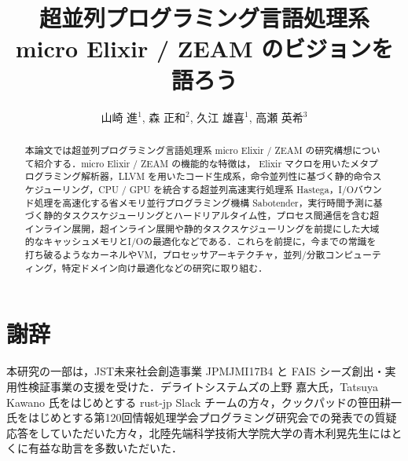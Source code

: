 \documentclass[japanese]{jssst_ppl}
\title{超並列プログラミング言語処理系 micro Elixir / ZEAM のビジョンを語ろう}
\author{山崎 進$^1$, 森 正和$^2$, 久江 雄喜$^1$, 高瀬 英希$^3$}
\begin{document}
\maketitle

\begin{abstract}
本論文では超並列プログラミング言語処理系 micro Elixir / ZEAM の研究構想について紹介する．micro Elixir / ZEAM の機能的な特徴は， Elixir マクロを用いたメタプログラミング解析器，LLVM を用いたコード生成系，命令並列性に基づく静的命令スケジューリング，CPU / GPU を統合する超並列高速実行処理系 Hastega，I/Oバウンド処理を高速化する省メモリ並行プログラミング機構 Sabotender，実行時間予測に基づく静的タスクスケジューリングとハードリアルタイム性，プロセス間通信を含む超インライン展開，超インライン展開や静的タスクスケジューリングを前提にした大域的なキャッシュメモリとI/Oの最適化などである．これらを前提に，今までの常識を打ち破るようなカーネルやVM，プロセッサアーキテクチャ，並列/分散コンピューティング，特定ドメイン向け最適化などの研究に取り組む．
\end{abstract}



\section*{謝辞}

本研究の一部は，JST未来社会創造事業 JPMJMI17B4 と FAIS シーズ創出・実用性検証事業の支援を受けた．デライトシステムズの上野 嘉大氏，Tatsuya Kawano 氏をはじめとする rust-jp Slack チームの方々，クックパッドの笹田耕一氏をはじめとする第120回情報処理学会プログラミング研究会での発表\cite{ZACKY18J}での質疑応答をしていただいた方々，北陸先端科学技術大学院大学の青木利晃先生にはとくに有益な助言を多数いただいた．




\end{document}
